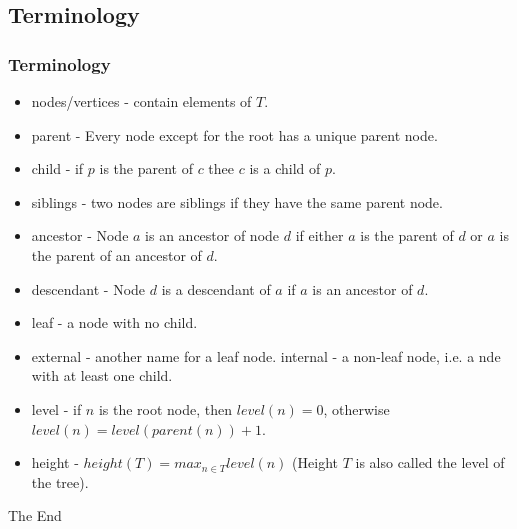 \documentclass{beamer}
\begin{document}
\subsection{Terminology}
\begin{frame}
\frametitle{Terminology}
\begin{itemize}
\item {\color{blue} nodes/vertices} - contain elements of $T$.
\item {\color{blue} parent} - Every node except for the root has a unique parent node.
\item {\color{blue} child} - if $p$ is the parent of $c$ thee $c$ is a child of $p$.
\item {\color{blue} siblings} - two nodes are siblings if they have the same parent node.
\item {\color{blue} ancestor} - Node $a$ is an ancestor of node $d$ if either $a$ is the parent of $d$ or $a$ is the parent of an ancestor of $d$.
\item {\color{blue} descendant} - Node $d$ is a descendant of $a$ if $a$ is an ancestor of $d$.
\item {\color{blue} leaf} - a node with no child.
\item {\color{blue} external} - another name for a leaf node.
{\color{blue} internal} - a non-leaf node, i.e. a nde with  at least one child.
\item {\color{blue} level} - if $n$ is the root node, then $level(n) = 0$, otherwise $level(n) = level(parent(n))+1$.
\item {\color{blue} height} - $height(T)=max_{n \in T}level(n)$ (Height $T$ is also called the level of the tree).
\end{itemize}
\end{frame}
\begin{frame} 
\Huge{\centerline{The End}}
\end{frame}
\end{document}
